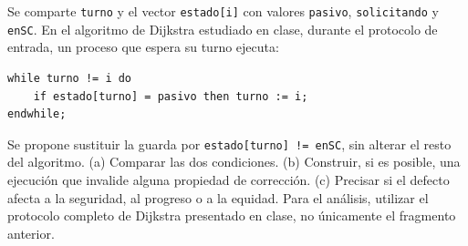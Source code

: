 \begin{ejercicio}
Se comparte \texttt{turno} y el vector \texttt{estado[i]} con valores \texttt{pasivo}, \texttt{solicitando} y
\texttt{enSC}. En el algoritmo de Dijkstra estudiado en clase, durante el protocolo de entrada, un proceso que
espera su turno ejecuta:
\begin{lstlisting}
while turno != i do
    if estado[turno] = pasivo then turno := i;
endwhile;
\end{lstlisting}
Se propone sustituir la guarda por \texttt{estado[turno] != enSC}, sin alterar el resto del algoritmo. (a) Comparar
las dos condiciones. (b) Construir, si es posible, una ejecución que invalide alguna propiedad de corrección. (c)
Precisar si el defecto afecta a la seguridad, al progreso o a la equidad. Para el análisis, utilizar el protocolo
completo de Dijkstra presentado en clase, no únicamente el fragmento anterior.
\end{ejercicio}
